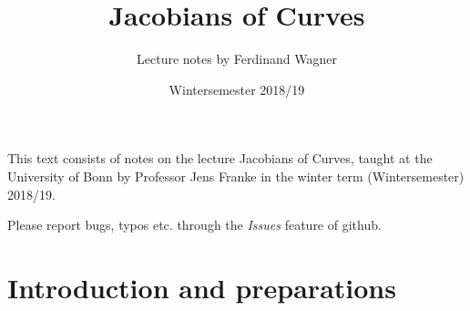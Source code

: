 \documentclass[a4paper,parskip=half,numbers=enddot, DIV=12]{scrreprt}
\title{Jacobians of Curves}
\author{Lecture notes by Ferdinand Wagner}
\date{Wintersemester 2018/19}
\begin{document}
\maketitle
{}

\thispagestyle{plain}
This text consists of notes on the lecture Jacobians of Curves, taught at the University of Bonn by Professor Jens Franke in the winter term (Wintersemester) 2018/19.

Please report bugs, typos etc. through the \emph{Issues} feature of github.

\tableofcontents


\chapter{Introduction and preparations}
\end{document}
